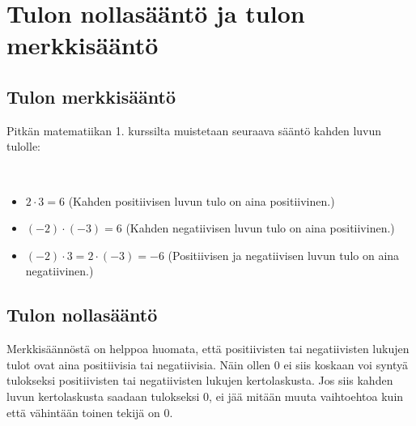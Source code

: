\chapter{Tulon nollasääntö ja tulon merkkisääntö}

\section{Tulon merkkisääntö}

Pitkän matematiikan 1. kurssilta muistetaan seuraava sääntö kahden luvun tulolle:


\begin{esimerkki}{\ }
\begin{itemize}
  \item $2\cdot 3 = 6$ (Kahden positiivisen luvun tulo on aina positiivinen.)
  \item $(-2)\cdot (-3) = 6$ (Kahden negatiivisen luvun tulo on aina positiivinen.)
  \item $(-2)\cdot 3 = 2\cdot (-3) = -6$ (Positiivisen ja negatiivisen luvun tulo on aina negatiivinen.)
\end{itemize}
\end{esimerkki}

\section{Tulon nollasääntö}

Merkkisäännöstä on helppoa huomata, että positiivisten tai negatiivisten
lukujen tulot ovat aina positiivisia tai negatiivisia. Näin ollen $0$ ei siis koskaan
voi syntyä tulokseksi positiivisten tai negatiivisten lukujen kertolaskusta. Jos siis kahden luvun
kertolaskusta saadaan tulokseksi $0$, ei jää mitään muuta vaihtoehtoa kuin että vähintään toinen tekijä on $0$.


